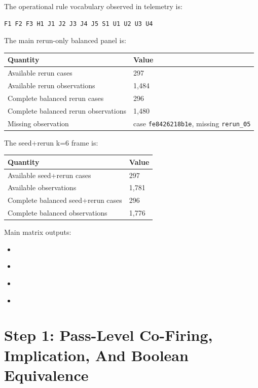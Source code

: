 \documentclass[11pt]{article}
\begin{document}
The operational rule vocabulary observed in telemetry is:

\begin{verbatim}
F1 F2 F3 H1 J1 J2 J3 J4 J5 S1 U1 U2 U3 U4
\end{verbatim}

The main rerun-only balanced panel is:

\begin{longtable}{L{0.55\textwidth} R{0.35\textwidth}}
\toprule
Quantity & Value \\
\midrule
\endhead
Available rerun cases & 297 \\
Available rerun observations & 1,484 \\
Complete balanced rerun cases & 296 \\
Complete balanced rerun observations & 1,480 \\
Missing observation & case \texttt{fe8426218b1e}, missing \texttt{rerun\_05} \\
\bottomrule
\end{longtable}

The seed+rerun k=6 frame is:

\begin{longtable}{L{0.55\textwidth} R{0.35\textwidth}}
\toprule
Quantity & Value \\
\midrule
\endhead
Available seed+rerun cases & 297 \\
Available observations & 1,781 \\
Complete balanced seed+rerun cases & 296 \\
Complete balanced observations & 1,776 \\
\bottomrule
\end{longtable}

Main matrix outputs:

\begin{itemize}[leftmargin=1.5em]
  \item \href{../data/rule_incidence_reruns.csv}{}
  \item \href{../data/rule_incidence_reruns_available.csv}{}
  \item \href{../data/rule_incidence_seed_and_reruns.csv}{}
  \item \href{../data/rule_incidence_seed_and_reruns_available.csv}{}
\end{itemize}

\section*{Step 1: Pass-Level Co-Firing, Implication, And Boolean Equivalence}
\end{document}
